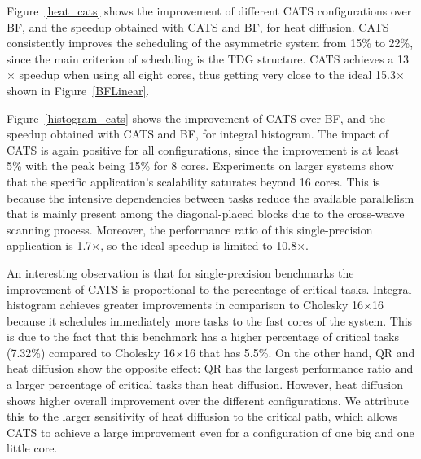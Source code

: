 Figure~\ref{heat_cats} shows the improvement of different CATS configurations over BF, and the speedup obtained with CATS and BF, for heat diffusion. 
CATS consistently improves the scheduling of the asymmetric system from 15\% to 22\%, since the main criterion of scheduling is the TDG structure. 
CATS achieves a 13$\times$ speedup when using all eight cores, thus getting very close to the ideal 15.3$\times$ shown in Figure~\ref{BFLinear}.

Figure~\ref{histogram_cats} shows the improvement of CATS over BF, and the speedup obtained with CATS and BF, for integral histogram. 
The impact of CATS is again positive for all configurations, since the improvement is at least 5\% with the peak being 15\% for 8 cores. 
Experiments on larger systems show that the specific application's scalability saturates beyond 16 cores. 
This is because the intensive dependencies between tasks reduce the available parallelism that is mainly present among the diagonal-placed blocks due to the cross-weave scanning process. 
Moreover, the performance ratio of this single-precision application is 1.7$\times$, so the ideal speedup is limited to 10.8$\times$.

An interesting observation is that for single-precision benchmarks the improvement of CATS is proportional to the percentage of critical tasks. 
Integral histogram achieves greater improvements in comparison to Cholesky 16$\times$16 because it schedules immediately more tasks to the fast cores of the system.
This is due to the fact that this benchmark has a higher percentage of critical tasks (7.32\%) compared to Cholesky 16$\times$16 that has 5.5\%. 
On the other hand, QR and heat diffusion show the opposite effect: QR has the largest performance ratio and a larger percentage of critical tasks than heat diffusion. 
However, heat diffusion shows higher overall improvement over the different configurations. 
We attribute this to the larger sensitivity of heat diffusion to the critical path, which allows CATS to achieve a large improvement even for a configuration of one big and one little core. 

